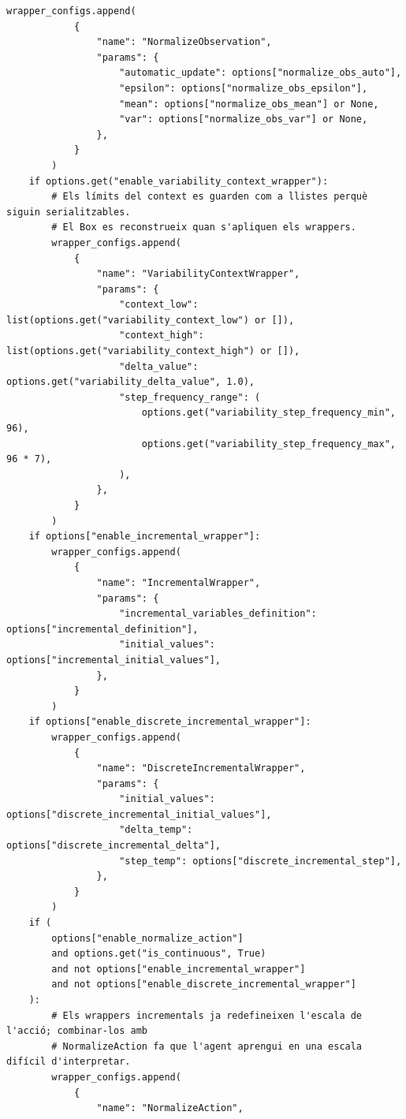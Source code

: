 \documentclass[10pt,a4paper]{article}
\begin{document}
\begin{lstlisting}[style=studioPython,caption={backend/entrenar\_agent\_wrappers.py},label={lst:backend-entrenar-agent-wrappers-py}]
        wrapper_configs.append(
            {
                "name": "NormalizeObservation",
                "params": {
                    "automatic_update": options["normalize_obs_auto"],
                    "epsilon": options["normalize_obs_epsilon"],
                    "mean": options["normalize_obs_mean"] or None,
                    "var": options["normalize_obs_var"] or None,
                },
            }
        )
    if options.get("enable_variability_context_wrapper"):
        # Els límits del context es guarden com a llistes perquè siguin serialitzables.
        # El Box es reconstrueix quan s'apliquen els wrappers.
        wrapper_configs.append(
            {
                "name": "VariabilityContextWrapper",
                "params": {
                    "context_low": list(options.get("variability_context_low") or []),
                    "context_high": list(options.get("variability_context_high") or []),
                    "delta_value": options.get("variability_delta_value", 1.0),
                    "step_frequency_range": (
                        options.get("variability_step_frequency_min", 96),
                        options.get("variability_step_frequency_max", 96 * 7),
                    ),
                },
            }
        )
    if options["enable_incremental_wrapper"]:
        wrapper_configs.append(
            {
                "name": "IncrementalWrapper",
                "params": {
                    "incremental_variables_definition": options["incremental_definition"],
                    "initial_values": options["incremental_initial_values"],
                },
            }
        )
    if options["enable_discrete_incremental_wrapper"]:
        wrapper_configs.append(
            {
                "name": "DiscreteIncrementalWrapper",
                "params": {
                    "initial_values": options["discrete_incremental_initial_values"],
                    "delta_temp": options["discrete_incremental_delta"],
                    "step_temp": options["discrete_incremental_step"],
                },
            }
        )
    if (
        options["enable_normalize_action"]
        and options.get("is_continuous", True)
        and not options["enable_incremental_wrapper"]
        and not options["enable_discrete_incremental_wrapper"]
    ):
        # Els wrappers incrementals ja redefineixen l'escala de l'acció; combinar-los amb
        # NormalizeAction fa que l'agent aprengui en una escala difícil d'interpretar.
        wrapper_configs.append(
            {
                "name": "NormalizeAction",

\end{lstlisting}
\end{document}
